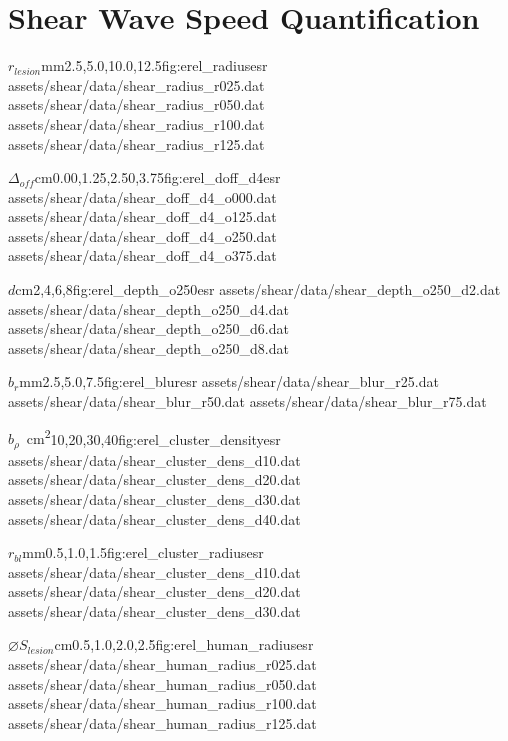 	\section{Shear Wave Speed Quantification}
	\label{appsec:dt_shear}
		\begin{multicols}{2}
			\characterizationDataTable%
				{$r_{lesion}$}{mm}{2.5,5.0,10.0,12.5}{fig:erel_radius}{esr}%
				{assets/shear/data/shear_radius_r025.dat}%
				{assets/shear/data/shear_radius_r050.dat}%
				{assets/shear/data/shear_radius_r100.dat}%
				{assets/shear/data/shear_radius_r125.dat}

			\characterizationDataTable%
				{$\Delta_{off}$}{cm}{0.00,1.25,2.50,3.75}{fig:erel_doff_d4}{esr}%
				{assets/shear/data/shear_doff_d4_o000.dat}%
				{assets/shear/data/shear_doff_d4_o125.dat}%
				{assets/shear/data/shear_doff_d4_o250.dat}%
				{assets/shear/data/shear_doff_d4_o375.dat}

			\characterizationDataTable%
				{$d$}{cm}{2,4,6,8}{fig:erel_depth_o250}{esr}%
				{assets/shear/data/shear_depth_o250_d2.dat}%
				{assets/shear/data/shear_depth_o250_d4.dat}%
				{assets/shear/data/shear_depth_o250_d6.dat}%
				{assets/shear/data/shear_depth_o250_d8.dat}

			\characterizationDataTable%
				{$b_r$}{mm}{2.5,5.0,7.5}{fig:erel_blur}{esr}%
				{assets/shear/data/shear_blur_r25.dat}%
				{assets/shear/data/shear_blur_r50.dat}%
				{assets/shear/data/shear_blur_r75.dat}%
				{}

			\characterizationDataTable%
				{$b_\rho$}{\si{\per\cm\squared}}{10,20,30,40}{fig:erel_cluster_density}{esr}%
				{assets/shear/data/shear_cluster_dens_d10.dat}%
				{assets/shear/data/shear_cluster_dens_d20.dat}%
				{assets/shear/data/shear_cluster_dens_d30.dat}%
				{assets/shear/data/shear_cluster_dens_d40.dat}

			\characterizationDataTable%
				{$r_{bl}$}{mm}{0.5,1.0,1.5}{fig:erel_cluster_radius}{esr}%
				{assets/shear/data/shear_cluster_dens_d10.dat}%
				{assets/shear/data/shear_cluster_dens_d20.dat}%
				{assets/shear/data/shear_cluster_dens_d30.dat}%
				{}

			\characterizationDataTable%
				{$\diameter S_{lesion}$}{cm}{0.5,1.0,2.0,2.5}{fig:erel_human_radius}{esr}%
				{assets/shear/data/shear_human_radius_r025.dat}%
				{assets/shear/data/shear_human_radius_r050.dat}%
				{assets/shear/data/shear_human_radius_r100.dat}%
				{assets/shear/data/shear_human_radius_r125.dat}
		\end{multicols}